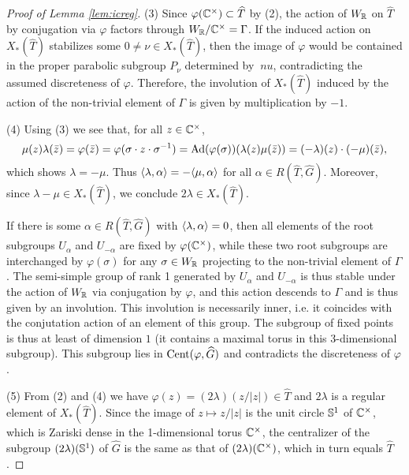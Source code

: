 \documentclass{article}
\theoremstyle{definition}
\numberwithin{equation}{section}
\renewcommand{\-}{\hyp{}}
\begin{document}
\begin{proof}[Proof of Lemma \ref{lem:icreg}]
(3) Since $\varphi(\mathbb{C}^\times) \subset \widehat T$ by (2), the action of $W_{\mathbb{R}}$ on $\hat T$ by conjugation via $\varphi$ factors through $W_{\mathbb{R}}/\mathbb{C}^\times=\Gamma$. If the induced action on $X_*(\hat T)$ stabilizes some $0 \neq \nu \in X_*(\hat T)$, then the image of $\varphi$ would be contained in the proper parabolic subgroup $P_\nu$ determined by $\ nu$, contradicting the assumed discreteness of $\varphi$. Therefore, the involution of $X_*(\hat T)$ induced by the action of the non-trivial element of $\Gamma$ is given by multiplication by $-1$. 

(4) Using (3) we see that, for all $z \in \mathbb{C}^\times$,
\[ \mu(z)\lambda(\bar z)=\varphi(\bar z)=\varphi(\sigma \cdot z \cdot \sigma^{-1})=\textrm{Ad}(\varphi(\sigma))(\lambda(z)\mu(\bar z))=(-\lambda)(z) \cdot (-\mu)(\bar z), \] which shows $\lambda=-\mu$. Thus $\langle\lambda,\alpha\rangle=-\langle\mu,\alpha\rangle$ for all $\alpha \in R(\hat T,\hat G)$. Moreover, since $\lambda-\mu \in X_*(\hat T)$, we conclude $2\lambda \in X_*(\hat T)$.

If there is some $\alpha \in R(\hat T,\hat G)$ with $\langle\lambda,\alpha\rangle=0$, then all elements of the root subgroups $U_\alpha$ and $U_{-\alpha}$ are fixed by $\varphi(\mathbb{C}^\times)$, while these two root subgroups are interchanged by $\varphi(\sigma)$ for any $\sigma \in W_{\mathbb{R}}$ projecting to the non-trivial element of $\Gamma$. The semi-simple group of rank 1 generated by $U_\alpha$ and $U_{-\alpha}$ is thus stable under the action of $W_{\mathbb{R}}$ via conjugation by $\varphi$, and this action descends to $\Gamma$ and is thus given by an involution. This involution is necessarily inner, i.e. it coincides with the conjutation action of an element of this group. The subgroup of fixed points is thus at least of dimension $1$ (it contains a maximal torus in this 3-dimensional subgroup). This subgroup lies in $\textrm{Cent}(\varphi,\widehat G)$ and contradicts the discreteness of $\varphi$.

(5) From (2) and (4) we have $\varphi(z)=(2\lambda)(z/|z|) \in \hat T$ and $2\lambda$ is a regular element of $X_*(\hat T)$. Since the image of $z \mapsto z/|z|$ is the unit circle $\mathbb{S}^1$ of $\mathbb{C}^\times$, which is Zariski dense in the 1-dimensional torus $\mathbb{C}^\times$, the centralizer of the subgroup $(2\lambda)(\mathbb{S}^1)$ of $\hat G$ is the same as that of $(2\lambda)(\mathbb{C}^\times)$, which in turn equals $\hat T$.
\end{proof}
\end{document}
